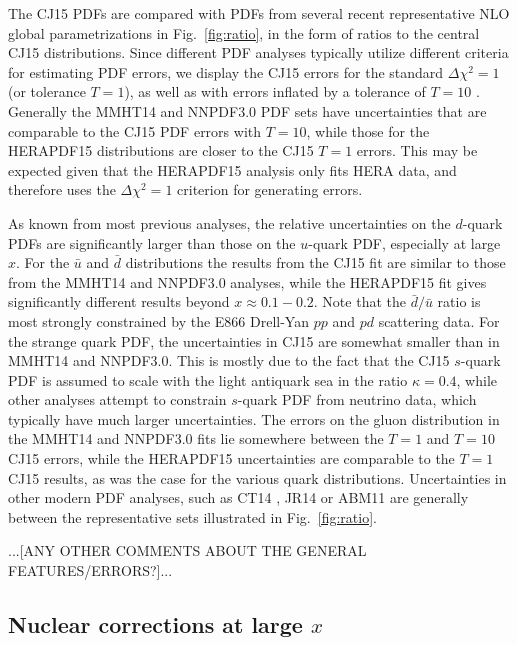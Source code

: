 \documentclass[aps,prd,amsmath,preprint]{revtex4}
\begin{document}
The CJ15 PDFs are compared with PDFs from several recent representative
NLO global parametrizations in Fig.~\ref{fig:ratio}, in the form of
ratios to the central CJ15 distributions.  Since different PDF analyses
typically utilize different criteria for estimating PDF errors, we
display the CJ15 errors for the standard $\Delta\chi^2=1$ (or tolerance
$T=1$), as well as with errors inflated by a tolerance of $T=10$
\cite{CJ12}.
Generally the MMHT14 \cite{MMHT14} and NNPDF3.0 \cite{NNPDF3.0} PDF
sets have uncertainties that are comparable to the CJ15 PDF errors with
$T=10$, while those for the HERAPDF15 \cite{HERAPDF15} distributions
are closer to the CJ15 $T=1$ errors.  This may be expected given that
the HERAPDF15 analysis only fits HERA data, and therefore uses the
$\Delta\chi^2=1$ criterion for generating errors.


As known from most previous analyses, the relative uncertainties
on the $d$-quark PDFs are significantly larger than those on the
$u$-quark PDF, especially at large $x$.
%
For the $\bar u$ and $\bar d$ distributions the results from the
CJ15 fit are similar to those from the MMHT14 and NNPDF3.0 analyses,
while the HERAPDF15 fit gives significantly different results beyond
$x \approx 0.1-0.2$.  Note that the $\bar d/\bar u$ ratio is most
strongly constrained by the E866 Drell-Yan $pp$ and $pd$ scattering
data.
%
For the strange quark PDF, the uncertainties in CJ15 are somewhat
smaller than in MMHT14 and NNPDF3.0.  This is mostly due to the
fact that the CJ15 $s$-quark PDF is assumed to scale with the
light antiquark sea in the ratio $\kappa=0.4$, while other analyses
attempt to constrain $s$-quark PDF from neutrino data, which typically
have much larger uncertainties.
%
The errors on the gluon distribution in the MMHT14 and NNPDF3.0 fits
lie somewhere between the $T=1$ and $T=10$ CJ15 errors, while the
HERAPDF15 uncertainties are comparable to the $T=1$ CJ15 results,
as was the case for the various quark distributions.
%
Uncertainties in other modern PDF analyses, such as CT14 \cite{CT14},
JR14 \cite{JR14} or ABM11 \cite{ABM11} are generally between the
representative sets illustrated in Fig.~\ref{fig:ratio}.

{\color{red} ...[ANY OTHER COMMENTS ABOUT THE GENERAL FEATURES/ERRORS?]...}


\subsection{Nuclear corrections at large $x$}
\label{ssec:largex}
\end{document}
